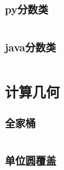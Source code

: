 \documentclass{article}
\begin{document}
\subsection{py分数类}
\inputminted[breaklines]{python}{../其他/py分数类.py}

\subsection{java分数类}
\inputminted[breaklines]{java}{../其他/java分数类.java}

\newpage
\section{计算几何}
\subsection{全家桶}
\inputminted[breaklines]{c++}{../计算几何/template.cpp}

\subsection{单位圆覆盖}
\inputminted[breaklines]{c++}{../计算几何/单位圆覆盖.cpp}

\end{document}
